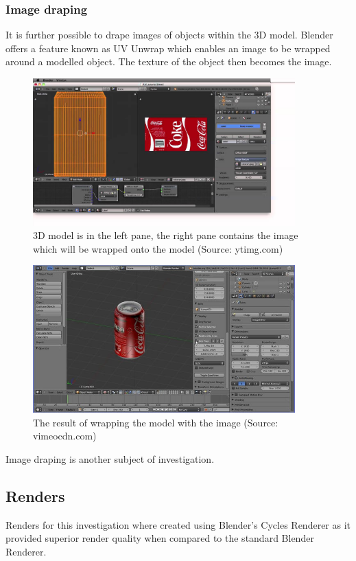 \documentclass[11pt,a4paper]{report}
\begin{document}
			\subsubsection{Image draping}
				It is further possible to drape images of objects within the 3D model. Blender offers a feature known as UV Unwrap which enables an image to be wrapped around a modelled object. The texture of the object then becomes the image.
				\begin{figure}[H]
					\centering
					\includegraphics[width=0.9\textwidth]{blender_uv_unwrap_1}
					\caption{3D model is in the left pane, the right pane contains the image which will be wrapped onto the model (Source: ytimg.com)}
					\label{fig:blender_uv_unwrap_1}
				\end{figure}
				\begin{figure}[H]
					\centering
					\includegraphics[width=0.9\textwidth]{blender_uv_unwrap_2}
					\caption{The result of wrapping the model with the image (Source: vimeocdn.com)}
					\label{fig:blender_uv_unwrap_2}
				\end{figure}
				
				Image draping is another subject of investigation.
				
		\subsection{Renders}
			Renders for this investigation where created using Blender's Cycles Renderer as it provided superior render quality when compared to the standard Blender Renderer.
			
\end{document}
